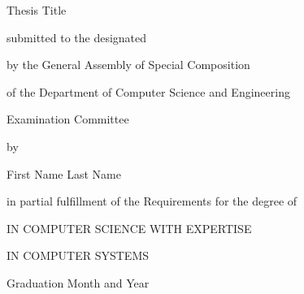 \thispagestyle{empty}
\begin{center}
	{\LARGE Thesis Title}
	\par
	\vspace{2.5cm} {\Large \csethesisTypeEn}
	
	\vspace{1.25cm} {\Large submitted to the designated}
	
	\vspace{0.75cm} {\Large by the General Assembly of Special Composition}
	
	\vspace{0.25cm} {\Large of the Department of Computer Science and Engineering}
	
	\vspace{0.25cm} {\Large Examination Committee}
	
	\vspace{1.25cm} {\Large by}
	
	\vspace{1.75cm} {\LARGE First Name Last Name}
	
	\vspace{1.25cm} {\Large in partial fulfillment of the Requirements for the degree of}
	
	\vspace{1.75cm} {\Large \csediplwmaEn}
	
	\vspace{0.5cm} {\Large IN COMPUTER SCIENCE WITH EXPERTISE}
	
	\vspace{0.5cm} {\Large IN COMPUTER SYSTEMS}
	\par
	\vfill {\Large Graduation Month and Year}
\end{center}